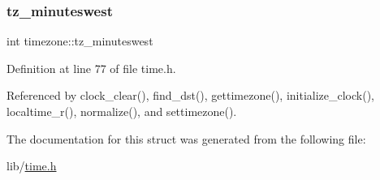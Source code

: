 \subsubsection{\texorpdfstring{tz\+\_\+minuteswest}{tz\_minuteswest}}
{\footnotesize\ttfamily int timezone\+::tz\+\_\+minuteswest}



Definition at line 77 of file time.\+h.



Referenced by clock\+\_\+clear(), find\+\_\+dst(), gettimezone(), initialize\+\_\+clock(), localtime\+\_\+r(), normalize(), and settimezone().



The documentation for this struct was generated from the following file\+:\begin{DoxyCompactItemize}
\item 
lib/\hyperlink{time_8h}{time.\+h}\end{DoxyCompactItemize}
